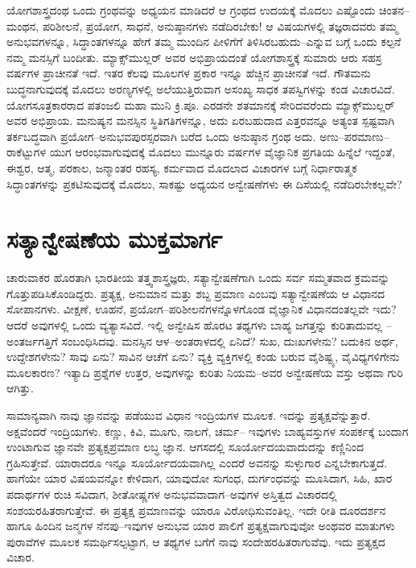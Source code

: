 ಯೋಗಶಾಸ್ತ್ರದಂಥ ಒಂದು ಗ್ರಂಥವನ್ನು ಅಧ್ಯಯನ ಮಾಡಿದರೆ ಆ ಗ್ರಂಥದ ಉದಯಕ್ಕೆ ಮೊದಲು ಎಷ್ಟೊಂದು ಚಿಂತನ–ಮಂಥನ, ಪರಿಶೀಲನೆ, ಪ್ರಯೋಗ, ಸಾಧನೆ, ಅನುಷ್ಠಾನಗಳು ನಡೆದಿರಬೇಕು! ಆ ವಿಷಯಗಳಲ್ಲಿ ತಜ್ಞರಾದವರು ತಮ್ಮ ಅನುಭವಗಳನ್ನೂ, ಸಿದ್ಧಾಂತಗಳನ್ನೂ ಹೇಗೆ ತಮ್ಮ ಮುಂದಿನ ಪೀಳಿಗೆಗೆ ತಿಳಿಸಿರಬಹುದು–ಎನ್ನುವ ಬಗ್ಗೆ ಒಂದು ಕಲ್ಪನೆ ನಮ್ಮ ಮನಸ್ಸಿಗೆ ಬಂದೀತು. ಮ್ಯಾಕ್ಸ್​ಮುಲ್ಲರ್ ಅವರ ಅಭಿಪ್ರಾಯದಂತೆ ಯೋಗಶಾಸ್ತ್ರಕ್ಕೆ ಸುಮಾರು ಆರು ಸಹಸ್ರ ವರ್ಷಗಳ ಪ್ರಾಚೀನತೆ ಇದೆ. ಇತರ ಕೆಲವು ಮೂಲಗಳ ಪ್ರಕಾರ ಇನ್ನೂ ಹೆಚ್ಚಿನ ಪ್ರಾಚೀನತೆ ಇದೆ. ಗೌತಮನು ಬುದ್ಧನಾಗುವುದಕ್ಕೆ ಮೊದಲು ಅರಣ್ಯಗಳಲ್ಲಿ ಅಲೆಯುತ್ತಿರುವಾಗ ಅಸಂಖ್ಯ ಸಾಧಕ ತಪಸ್ವಿಗಳನ್ನು ಕಂಡ ವಿಚಾರವಿದೆ. ಯೋಗಸೂತ್ರಕಾರರಾದ ಪತಂಜಲಿ ಮಹಾ ಮುನಿ ಕ್ರಿ.ಪೂ. ಎರಡನೇ ಶತಮಾನಕ್ಕೆ ಸೇರಿದವರೆಂದು ಮ್ಯಾಕ್ಸ್​ಮುಲ್ಲರ್ ಅವರ ಅಭಿಪ್ರಾಯ. ಮನುಷ್ಯನ ಮನಸ್ಸಿನ ಸ್ಥಿತಿಗತಿಗಳನ್ನೂ, ಅದು ಏರಬಹುದಾದ ಎತ್ತರವನ್ನೂ ಅತ್ಯಂತ ಸ್ಪಷ್ಟವಾಗಿ ತರ್ಕಬದ್ಧವಾಗಿ ಪ್ರಯೋಗ–ಅನುಭವಪುರಸ್ಸರವಾಗಿ ಬರೆದ ಒಂದು ಅನುಷ್ಠಾನ ಗ್ರಂಥ ಅದು. ಅಣು–ಪರಮಾಣು–ರಾಕೆಟ್ಟುಗಳ ಯುಗ ಆರಂಭವಾಗುವುದಕ್ಕೆ ಮೊದಲು ಮುನ್ನೂರು ವರ್ಷಗಳ ವೈಜ್ಞಾನಿಕ ಪ್ರಗತಿಯ ಹಿನ್ನೆಲೆ ಇದ್ದಂತೆ, ಈಶ್ವರ, ಆತ್ಮ, ಪರಕಾಲ, ಜನ್ಮಾಂತರ ರಹಸ್ಯ, ಕರ್ಮವಾದ ಮೊದಲಾದ ವಿಚಾರಗಳ ಬಗ್ಗೆ ನಿರ್ಧಾರಾತ್ಮಕ ಸಿದ್ಧಾಂತಗಳನ್ನು ಪ್ರಕಟಿಸುವುದಕ್ಕೆ ಮೊದಲು, ಸಾಕಷ್ಟು ಅಧ್ಯಯನ ಅನ್ವೇಷಣೆಗಳು ಈ ದಿಸೆಯಲ್ಲಿ ನಡೆದಿರಬೇಕಲ್ಲವೇ?


\section*{ಸತ್ಯಾನ್ವೇಷಣೆಯ ಮುಕ್ತಮಾರ್ಗ}


ಚಾರುವಾಕರ ಹೊರತಾಗಿ ಭಾರತೀಯ ತತ್ತ್ವಶಾಸ್ತ್ರಜ್ಞರು, ಸತ್ಯಾನ್ವೇಷಣೆಗಾಗಿ ಒಂದು ಸರ್ವ ಸಮ್ಮತವಾದ ಕ್ರಮವನ್ನು ಗೊತ್ತುಪಡಿಸಿಕೊಂಡಿದ್ದರು. ಪ್ರತ್ಯಕ್ಷ, ಅನುಮಾನ ಮತ್ತು ಶಬ್ದ ಪ್ರಮಾಣ ಎಂಬವು ಸತ್ಯಾನ್ವೇಷಣೆಯ ಆ ವಿಧಾನದ ಸೋಪಾನಗಳು. ವೀಕ್ಷಣೆ, ಊಹನೆ, ಪ್ರಯೋಗ–ಪರಿಶೀಲನೆಗಳನ್ನೊಳಗೊಂಡ ವೈಜ್ಞಾನಿಕ ವಿಧಾನದಂತಲ್ಲವೇ ಇದು? ಆದರೆ ಅವುಗಳಲ್ಲಿ ಒಂದು ವ್ಯತ್ಯಾಸವಿದೆ. ಇಲ್ಲಿ ಅನ್ವೇಷಿಸ ಹೊರಟ ತಥ್ಯಗಳು ಬಾಹ್ಯ ಜಗತ್ತನ್ನು ಕುರಿತಾದುವಲ್ಲ – ಅಂತರ್ಜಗ\-ತ್ತಿಗೆ ಸಂಬಂಧಿಸಿದವು. ಮನಸ್ಸಿನ ಆಳ–ಅಂತರಾಳದಲ್ಲಿ ಏನಿದೆ? ಸುಖ, ದುಃಖಗಳೇನು? ಬದುಕಿನ ಅರ್ಥ, ಉದ್ದೇಶಗಳೇನು? ಸಾವು ಏನು? ಸಾವಿನ ಆಚೆಗೆ ಏನು? ವ್ಯಕ್ತಿ ವ್ಯಕ್ತಿಗಳಲ್ಲಿ ಕಂಡು ಬರುವ ವೈಶಿಷ್ಟ್ಯ, ವೈವಿಧ್ಯಗಳಿಗೇನು ಮೂಲಕಾರಣ? ಇತ್ಯಾದಿ ಪ್ರಶ್ನೆಗಳ ಉತ್ತರ, ಅವುಗಳನ್ನು ಕುರಿತು ನಿಯಮ–ಅವರ ಅನ್ವೇಷಣೆಯ ವಸ್ತು ಅಥವಾ ಗುರಿ ಆಗಿತ್ತು.

ಸಾಮಾನ್ಯವಾಗಿ ನಾವು ಜ್ಞಾನವನ್ನು ಪಡೆಯುವ ವಿಧಾನ ಇಂದ್ರಿಯಗಳ ಮೂಲಕ. ಇದನ್ನು ಪ್ರತ್ಯಕ್ಷವೆನ್ನುತ್ತಾರೆ. ಅಕ್ಷವೆಂದರೆ ಇಂದ್ರಿಯಗಳು. ಕಣ್ಣು, ಕಿವಿ, ಮೂಗು, ನಾಲಗೆ, ಚರ್ಮ– ಇವುಗಳು ಬಾಹ್ಯವಸ್ತುಗಳ ಸಂಪರ್ಕಕ್ಕೆ ಬಂದಾಗ ಉಂಟಾಗುವ ಜ್ಞಾನವೇ ಪ್ರತ್ಯಕ್ಷಪ್ರಮಾಣ ಲಬ್ಧ ಜ್ಞಾನ. ಆಗಸದಲ್ಲಿ ಸೂರ್ಯೋದಯವಾದುದನ್ನು ಕಣ್ಣಿನಿಂದ ಗ್ರಹಿಸುತ್ತೇವೆ. ಯಾರಾದರೂ ಇನ್ನೂ ಸೂರ್ಯೋದಯವಾಗಿಲ್ಲ ಎಂದರೆ ಅವನನ್ನು ಸುಳ್ಳುಗಾರ ಎನ್ನಬೇಕಾಗುತ್ತದೆ. ಹಾಗೆಯೇ ಯಾರ ವಿಷಯವನ್ನೋ ಕೇಳಿದಾಗ, ಯಾವುದೋ ಸುಗಂಧ, ದುರ್ಗಂಧವನ್ನು ಮೂಸಿದಾಗ, ಸಿಹಿ, ಖಾರ ಪದಾರ್ಥಗಳ ರುಚಿ ಸವಿದಾಗ, ಶೀತೋಷ್ಣಗಳ ಅನುಭವವಾದಾಗ–ಅವುಗಳ ಅಸ್ತಿತ್ವದ ವಿಚಾರದಲ್ಲಿ ಸಂಶಯರಹಿತರಾಗುತ್ತೇವೆ. ಈ ಪ್ರತ್ಯಕ್ಷ ಪ್ರಮಾಣವನ್ನು ಯಾರೂ ವಿರೋಧಿಸು\-ವಂತಿಲ್ಲ. ಇದೇ ರೀತಿ ದೂರದರ್ಶನ ಹಾಗೂ ಹಿಂದಿನ ಜನ್ಮಗಳ ನೆನಪು–ಇವುಗಳ ಅನುಭವ ಯಾರ ಪಾಲಿಗೆ ಪ್ರತ್ಯಕ್ಷವಾಗುವುವೋ ಅಂಥವರ ಮಾತುಗಳು ಪುರಾವೆಗಳ ಮೂಲಕ ಸಮರ್ಥಿಸಲ್ಪಟ್ಟಾಗ, ಆ ತಥ್ಯಗಳ ಬಗೆಗೆ ನಾವು ಸಂದೇಹರಹಿತರಾಗುವೆವು. ಇದು ಪ್ರತ್ಯಕ್ಷದ ವಿಚಾರ.

